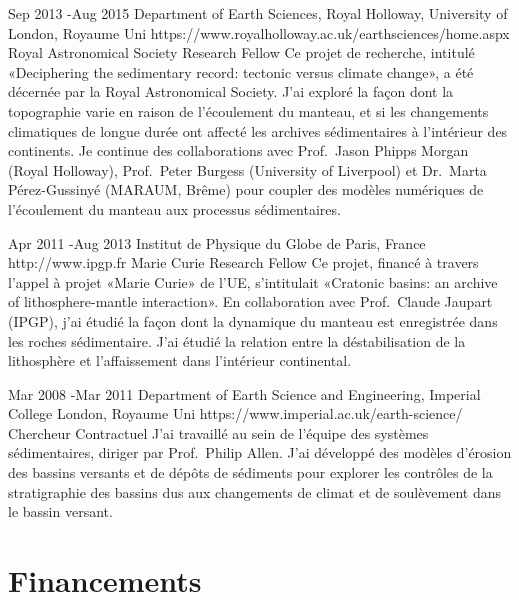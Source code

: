 \documentclass[hidelinks,10pt]{article} %
\begin{document}

\job
{Sep 2013 -}{Aug 2015}
{Department of Earth Sciences, Royal Holloway, University of London, Royaume Uni}
{https://www.royalholloway.ac.uk/earthsciences/home.aspx}
{Royal Astronomical Society Research Fellow}
{Ce projet de recherche, intitulé «Deciphering the sedimentary record: tectonic versus climate change», a été décernée par la Royal Astronomical Society. J'ai exploré la façon dont la topographie varie en raison de l'écoulement du manteau, et si les changements climatiques de longue durée ont affecté les archives sédimentaires à l'intérieur des continents. Je continue des collaborations avec Prof.~Jason Phipps Morgan (Royal Holloway), Prof.~Peter Burgess (University of Liverpool) et Dr.~Marta Pérez-Gussinyé (MARAUM, Brême) pour coupler des modèles numériques de l'écoulement du manteau aux processus sédimentaires.}


\job
{Apr 2011 -}{Aug 2013}
{Institut de Physique du Globe de Paris, France}
{http://www.ipgp.fr}
{Marie Curie Research Fellow}
{Ce projet, financé à travers l'appel à projet «Marie Curie» de l'UE, s'intitulait «Cratonic basins: an archive of lithosphere-mantle interaction». En collaboration avec Prof.~Claude Jaupart (IPGP), j'ai étudié la façon dont la dynamique du manteau est enregistrée dans les roches sédimentaire. J'ai étudié la relation entre la déstabilisation de la lithosphère et l'affaissement dans l'intérieur continental.}


\job
{Mar 2008 -}{Mar 2011}
{Department of Earth Science and Engineering, Imperial College London, Royaume Uni}
{https://www.imperial.ac.uk/earth-science/}
{Chercheur Contractuel}
{J'ai travaillé au sein de l'équipe des systèmes sédimentaires, diriger par Prof.~Philip Allen. J'ai développé des modèles d'érosion des bassins versants et de dépôts de sédiments pour explorer les contrôles de la stratigraphie des bassins dus aux changements de climat et de soulèvement dans le bassin versant.}


\section{Financements}
\end{document}
